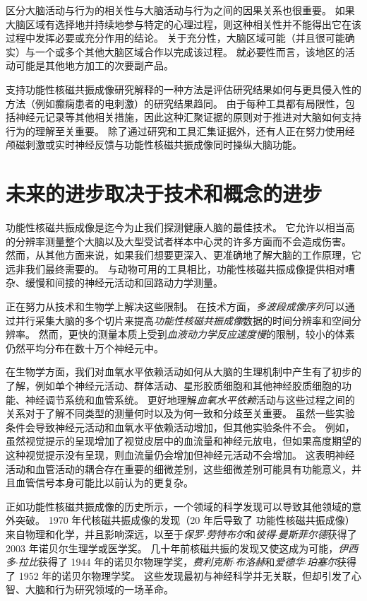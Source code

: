 区分大脑活动与行为的相关性与大脑活动与行为之间的因果关系也很重要。
如果大脑区域有选择地并持续地参与特定的心理过程，则这种相关性并不能得出它在该过程中发挥必要或充分作用的结论。
关于充分性，大脑区域可能（并且很可能确实）与一个或多个其他大脑区域合作以完成该过程。
就必要性而言，该地区的活动可能是其他地方加工的次要副产品。


支持功能性核磁共振成像研究解释的一种方法是评估研究结果如何与更具侵入性的方法（例如癫痫患者的电刺激）的研究结果趋同。
由于每种工具都有局限性，包括神经元记录等其他相关措施，因此这种汇聚证据的原则对于推进对大脑如何支持行为的理解至关重要。
除了通过研究和工具汇集证据外，还有人正在努力使用经颅磁刺激或实时神经反馈与功能性核磁共振成像同时操纵大脑功能。




\section{未来的进步取决于技术和概念的进步}

功能性核磁共振成像是迄今为止我们探测健康人脑的最佳技术。
它允许以相当高的分辨率测量整个大脑以及大型受试者样本中心灵的许多方面而不会造成伤害。
然而，从其他方面来说，如果我们想要更深入、更准确地了解大脑的工作原理，它远非我们最终需要的。
与动物可用的工具相比，功能性核磁共振成像提供相对嘈杂、缓慢和间接的神经元活动和回路动力学测量。


正在努力从技术和生物学上解决这些限制。
在技术方面，\textit{多波段成像序列}可以通过并行采集大脑的多个切片来提高\textit{功能性核磁共振成像}数据的时间分辨率和空间分辨率。
然而，更快的测量本质上受到\textit{血液动力学反应速度慢}的限制，较小的体素仍然平均分布在数十万个神经元中。


在生物学方面，我们对血氧水平依赖活动如何从大脑的生理机制中产生有了初步的了解，例如单个神经元活动、群体活动、星形胶质细胞和其他神经胶质细胞的功能、神经调节系统和血管系统。
更好地理解\textit{血氧水平依赖}活动与这些过程之间的关系对于了解不同类型的测量何时以及为何一致和分歧至关重要。 
虽然一些实验条件会导致神经元活动和血氧水平依赖活动增加，但其他实验条件不会。
例如，虽然视觉提示的呈现增加了视觉皮层中的血流量和神经元放电，但如果高度期望的这种视觉提示没有呈现，则血流量仍会增加但神经元活动不会增加。
这表明神经活动和血管活动的耦合存在重要的细微差别，这些细微差别可能具有功能意义，并且血管信号本身可能比以前认为的更复杂。


正如功能性核磁共振成像的历史所示，一个领域的科学发现可以导致其他领域的意外突破。
1970 年代核磁共振成像的发现（20 年后导致了 功能性核磁共振成像）来自物理和化学，并且影响深远，以至于\textit{保罗$\cdot$劳特布尔}和\textit{彼得$\cdot$曼斯菲尔德}获得了 2003 年诺贝尔生理学或医学奖。
几十年前核磁共振的发现又使这成为可能，\textit{伊西多$\cdot$拉比}获得了 1944 年的诺贝尔物理学奖，\textit{费利克斯$\cdot$布洛赫}和\textit{爱德华$\cdot$珀塞尔}获得了 1952 年的诺贝尔物理学奖。
这些发现最初与神经科学并无关联，但却引发了心智、大脑和行为研究领域的一场革命。


